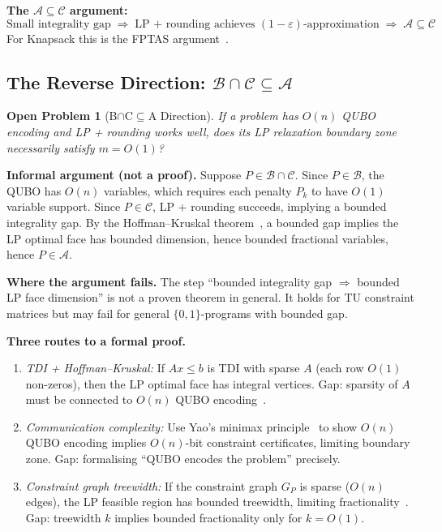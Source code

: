 \documentclass[11pt]{article}
\newtheorem*{openprob}{Open Problem}
\theoremstyle{remark}
\newcommand{\calA}{\mathcal{A}}
\newcommand{\calB}{\mathcal{B}}
\newcommand{\calC}{\mathcal{C}}
\begin{document}
\noindent\textbf{The $\calA \subseteq \calC$ argument:}
\begin{equation}
  \text{Small integrality gap}
  \;\Rightarrow\;
  \text{LP + rounding achieves }(1-\varepsilon)\text{-approximation}
  \;\Rightarrow\;
  \calA \subseteq \calC
\end{equation}
For Knapsack this is the FPTAS argument~\cite{vazirani2001}.

\subsection{The Reverse Direction: $\calB \cap \calC \subseteq \calA$}

\begin{openprob}[B$\cap$C$\subseteq$A Direction]
\label{op:BcapC}
If a problem has $O(n)$ QUBO encoding \emph{and} LP + rounding works well,
does its LP relaxation boundary zone necessarily satisfy $m = O(1)$?
\end{openprob}

\noindent\textbf{Informal argument (not a proof).}
Suppose $P \in \calB \cap \calC$. Since $P \in \calB$, the QUBO has $O(n)$
variables, which requires each penalty $P_k$ to have $O(1)$ variable support.
Since $P \in \calC$, LP + rounding succeeds, implying a bounded integrality
gap. By the Hoffman--Kruskal theorem~\cite{hoffmankruskal1956,schrijver1986},
a bounded gap implies the LP optimal face has bounded dimension, hence bounded
fractional variables, hence $P \in \calA$.

\noindent\textbf{Where the argument fails.}
The step ``bounded integrality gap $\Rightarrow$ bounded LP face dimension''
is not a proven theorem in general. It holds for TU constraint matrices but
may fail for general $\{0,1\}$-programs with bounded gap.

\noindent\textbf{Three routes to a formal proof.}
\begin{enumerate}
  \item \emph{TDI + Hoffman--Kruskal:} If $Ax \leq b$ is TDI with sparse
    $A$ (each row $O(1)$ non-zeros), then the LP optimal face has integral
    vertices. Gap: sparsity of $A$ must be connected to $O(n)$ QUBO
    encoding~\cite{hoffmankruskal1956,schrijver1986}.
  \item \emph{Communication complexity:} Use Yao's minimax
    principle~\cite{yao1979,kushilevitz1997} to show $O(n)$ QUBO encoding
    implies $O(n)$-bit constraint certificates, limiting boundary zone.
    Gap: formalising ``QUBO encodes the problem'' precisely.
  \item \emph{Constraint graph treewidth:} If the constraint graph $G_P$
    is sparse ($O(n)$ edges), the LP feasible region has bounded treewidth,
    limiting fractionality~\cite{bodlaender1993,cygan2015}. Gap: treewidth
    $k$ implies bounded fractionality only for $k = O(1)$.
\end{enumerate}
\end{document}
